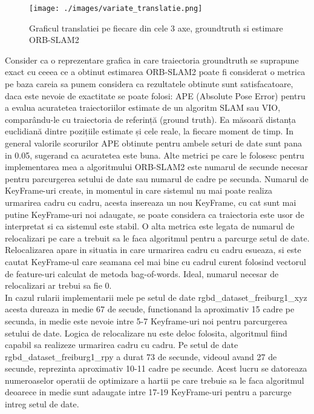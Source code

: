 \documentclass[12pt,a4paper]{report}
\begin{document}
\begin{figure}[htbp] 
  \centering
  \texttt{[image: ./images/variate\_translatie.png]}
  \caption{Graficul translatiei pe fiecare din cele 3 axe, groundtruth si estimare ORB-SLAM2}
  \label{fig:exemplu_imagine}
\end{figure}
Consider ca o reprezentare grafica in care traiectoria groundtruth se suprapune exact cu
ceeea ce a obtinut estimarea ORB-SLAM2 poate fi considerat o metrica pe baza careia sa 
punem considera ca rezultatele obtinute sunt satisfacatoare, daca este nevoie de exactitate 
se poate folosi: APE (Absolute Pose Error) pentru a evalua acuratetea traiectoriilor estimate
de un algoritm SLAM sau VIO, comparându-le cu traiectoria de referință (ground truth). Ea
măsoară distanța euclidiană dintre pozițiile estimate și cele reale, la fiecare moment de timp.
In general valorile scorurilor APE obtinute pentru ambele seturi de date sunt pana in 0.05,
sugerand ca acuratetea este buna. Alte metrici pe care le folosesc pentru implementarea 
mea a algoritmului ORB-SLAM2 este numarul de secunde necesar pentru parcurgerea setului de 
date sau numarul de cadre pe secunda. Numarul de KeyFrame-uri create, in momentul in care 
sistemul nu mai poate realiza urmarirea cadru cu cadru, acesta insereaza un nou KeyFrame,
cu cat sunt mai putine KeyFrame-uri noi adaugate, se poate considera ca traiectoria este 
usor de interpretat si ca sistemul este stabil. O alta metrica este legata de numarul 
de relocalizari pe care a trebuit sa le faca algoritmul pentru a parcurge setul de date.
Relocalizarea apare in situatia in care urmarirea cadru cu cadru esueaza, si este cautat 
KeyFrame-ul care seamana cel mai bine cu cadrul curent folosind vectorul de feature-uri 
calculat de metoda bag-of-words. Ideal, numarul necesar de relocalizari ar trebui sa fie 0.\\
In cazul rularii implementarii mele pe setul de date rgbd\_dataset\_freiburg1\_xyz acesta 
dureaza in medie 67 de secude, functionand la aproximativ 15 cadre pe secunda, in medie 
este nevoie intre 5{-}7 Keyframe-uri noi pentru parcurgerea setului de date. Logica 
de relocalizare nu este deloc folosita, algoritmul fiind capabil sa realizeze urmarirea
cadru cu cadru.
Pe setul de date rgbd\_dataset\_freiburg1\_rpy a durat 73 de secunde, videoul avand 
27 de secunde, reprezinta aproximativ 10{-}11 cadre pe secunde. Acest lucru se datoreaza 
numeroaselor operatii de optimizare a hartii pe care trebuie sa le faca algoritmul deoarece 
in medie sunt adaugate intre 17{-}19 KeyFrame-uri pentru a parcurge intreg setul de date.
\end{document}
